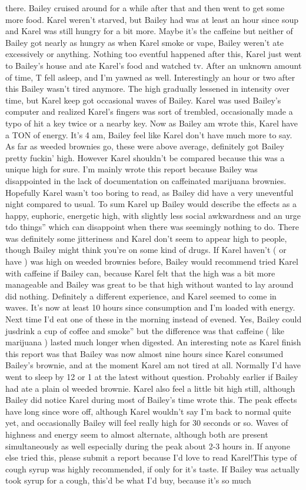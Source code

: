 \documentclass[12pt]{book}
\begin{document}
there. Bailey cruised around for a while after that and then went to get some more food. Karel weren't starved, but Bailey had was at least an hour since soup and Karel was still hungry for a bit more. Maybe it's the caffeine but neither of Bailey got nearly as hungry as when Karel smoke or vape, Bailey weren't ate excessively or anything. Nothing too eventful happened after this, Karel just went to Bailey's house and ate Karel's food and watched tv. After an unknown amount of time, T fell asleep, and I'm yawned as well. Interestingly an hour or two after this Bailey wasn't tired anymore. The high gradually lessened in intensity over time, but Karel keep got occasional waves of Bailey. Karel was used Bailey's computer and realized Karel's fingers was sort of trembled, occasionally made a typo of hit a key twice or a nearby key. Now as Bailey am wrote this, Karel have a TON of energy. It's 4 am, Bailey feel like Karel don't have much more to say. As far as weeded brownies go, these were above average, definitely got Bailey pretty fuckin' high. However Karel shouldn't be compared because this was a unique high for sure. I'm mainly wrote this report because Bailey was disappointed in the lack of documentation on caffeinated marijuana brownies. Hopefully Karel wasn't too boring to read, as Bailey did have a very uneventful night compared to usual. To sum Karel up Bailey would describe the effects as a happy, euphoric, energetic high, with slightly less social awkwardness and an urge tdo things'' which can disappoint when there was seemingly nothing to do. There was definitely some jitteriness and Karel don't seem to appear high to people, though Bailey might think you're on some kind of drugs. If Karel haven't ( or have ) was high on weeded brownies before, Bailey would recommend tried Karel with caffeine if Bailey can, because Karel felt that the high was a bit more manageable and Bailey was great to be that high without wanted to lay around did nothing. Definitely a different experience, and Karel seemed to come in waves. It's now at least 10 hours since consumption and I'm loaded with energy. Next time I'd eat one of these in the morning instead of evened. Yes, Bailey could jusdrink a cup of coffee and smoke'' but the difference was that caffeine ( like marijuana ) lasted much longer when digested. An interesting note as Karel finish this report was that Bailey was now almost nine hours since Karel consumed Bailey's brownie, and at the moment Karel am not tired at all. Normally I'd have went to sleep by 12 or 1 at the latest without question. Probably earlier if Bailey had ate a plain ol weeded brownie. Karel also feel a little bit high still, although Bailey did notice Karel during most of Bailey's time wrote this. The peak effects have long since wore off, although Karel wouldn't say I'm back to normal quite yet, and occasionally Bailey will feel really high for 30 seconds or so. Waves of highness and energy seem to almost alternate, although both are present simultaneously as well especially during the peak about 2-3 hours in. If anyone else tried this, please submit a report because I'd love to read Karel!This type of cough syrup was highly recommended, if only for it's taste. If Bailey was actually took syrup for a cough, this'd be what I'd buy, because it's so much 
\end{document}
